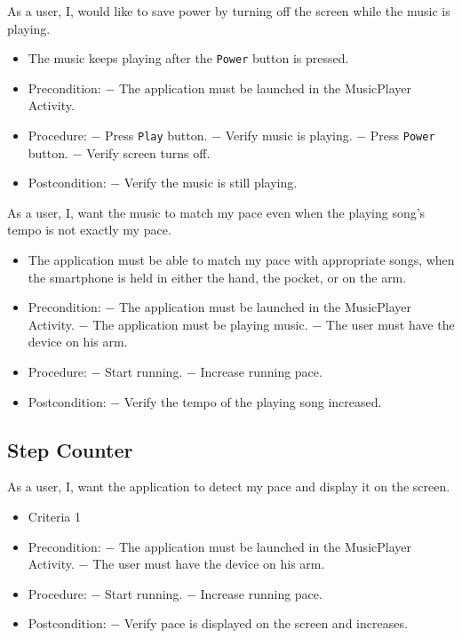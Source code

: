 {As a user, I, would like to save power by turning off the screen while the music is playing.}
{\begin{itemize}
\item The music keeps playing after the \texttt{Power} button is pressed.
\end{itemize}}
{\begin{itemize}
\item Precondition: 
\subitem $-$ The application must be launched in the MusicPlayer Activity.

\item Procedure:
\subitem $-$ Press \texttt{Play} button.
\subitem $-$ Verify music is playing.
\subitem $-$ Press \texttt{Power} button.
\subitem $-$ Verify screen turns off.

\item Postcondition:
\subitem $-$ Verify the music is still playing.
\end{itemize}}

{As a user, I, want the music to match my pace even when the playing song's tempo is not exactly my pace.}
{\begin{itemize}
\item The application must be able to match my pace with appropriate songs, when the smartphone is held in either the hand, the pocket, or on the arm.
\end{itemize}}
{\begin{itemize}
\item Precondition: 
\subitem $-$ The application must be launched in the MusicPlayer Activity.
\subitem $-$ The application must be playing music.
\subitem $-$ The user must have the device on his arm.

\item Procedure:
\subitem $-$ Start running.
\subitem $-$ Increase running pace.

\item Postcondition:
\subitem $-$ Verify the tempo of the playing song increased.
\end{itemize}}

\subsection{Step Counter}
{As a user, I, want the application to detect my pace and display it on the screen. }
{\begin{itemize}
\item Criteria 1
\end{itemize}}
{\begin{itemize}
\item Precondition: 
\subitem $-$ The application must be launched in the MusicPlayer Activity.
\subitem $-$ The user must have the device on his arm.

\item Procedure:
\subitem $-$ Start running.
\subitem $-$ Increase running pace.

\item Postcondition:
\subitem $-$ Verify pace is displayed on the screen and increases.
\end{itemize}}

